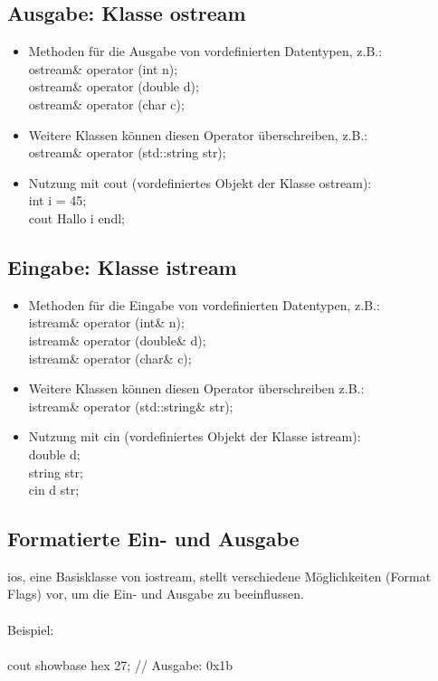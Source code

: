\subsection{Ausgabe: Klasse ostream}
\label{sec:Ausgabe: Klasse ostream}
\begin{itemize}
	\item Methoden für die Ausgabe von vordefinierten Datentypen, z.B.:
		\\ ostream\& operator \flq\flq(int n);
		\\ ostream\& operator \flq\flq(double d);
		\\ ostream\& operator \flq\flq(char c);
	\item Weitere Klassen können diesen Operator überschreiben, z.B.:
		\\ ostream\& operator \flq\flq(std::string str);
	\item Nutzung mit cout (vordefiniertes Objekt der Klasse ostream):
		\\ int i = 45;
		\\cout \flq\flq \grqq Hallo  \grqq \flq\flq i \flq\flq endl;
\end{itemize}

\subsection{Eingabe: Klasse istream}
\label{sec:Eingabe: Klasse istream}
\begin{itemize}
	\item Methoden für die Eingabe von vordefinierten Datentypen, z.B.:
		\\ istream\& operator \frq\frq(int\& n);
		\\ istream\& operator \frq\frq(double\& d);
		\\ istream\& operator \frq\frq(char\& c);
	\item Weitere Klassen können diesen Operator überschreiben z.B.:
		\\ istream\& operator \frq\frq(std::string\& str);
	\item Nutzung mit cin (vordefiniertes Objekt der Klasse istream):
		\\ double d;
		\\ string str;
		\\ cin \frq\frq d \frq\frq str;
\end{itemize}

\subsection{Formatierte Ein- und Ausgabe}
\label{sec:Formatierte Ein- und Ausgabe}
ios, eine Basisklasse von iostream, stellt verschiedene Möglichkeiten (Format Flags) vor, um die Ein- und Ausgabe zu beeinflussen.
\\ \\
Beispiel:
\\ \\
cout \flq\flq \color{red} showbase \flq\flq \color{green} hex \flq\flq \color{black}27;	// Ausgabe: \color{red}0x\color{green}1b \color{black}

